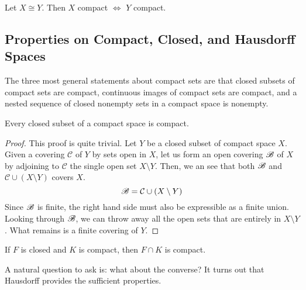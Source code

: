   \begin{corollary}
    Let $X \cong Y$. Then $X$ compact $\iff$ $Y$ compact. 
  \end{corollary}

\subsection{Properties on Compact, Closed, and Hausdorff Spaces}

  The three most general statements about compact sets are that closed subsets of compact sets are compact, continuous images of compact sets are compact, and a nested sequence of closed nonempty sets in a compact space is nonempty. 

  \begin{theorem}
    Every closed subset of a compact space is compact. 
  \end{theorem}
  \begin{proof}
    This proof is quite trivial. Let $Y$ be a closed subset of compact space $X$. Given a covering $\mathcal{C}$ of $Y$ by sets open in $X$, let us form an open covering $\operatorname{\mathscr{B}}$ of $X$ by adjoining to $\mathcal{C}$ the single open set $X \setminus Y$. Then, we an see that both $\operatorname{\mathscr{B}}$ and $\mathcal{C} \cup (X \setminus Y)$ covers $X$. 
    \begin{equation}
      \operatorname{\mathscr{B}} = \mathcal{C} \cup (X \setminus Y)
    \end{equation}
    Since $\operatorname{\mathscr{B}}$ is finite, the right hand side must also be expressible as a finite union. Looking through $\operatorname{\mathscr{B}}$, we can throw away all the open sets that are entirely in $X \setminus Y$. What remains is a finite covering of $Y$. 
  \end{proof}

  \begin{corollary}
    If $F$ is closed and $K$ is compact, then $F \cap K$ is compact. 
  \end{corollary}

  A natural question to ask is: what about the converse? It turns out that Hausdorff provides the sufficient properties. 

